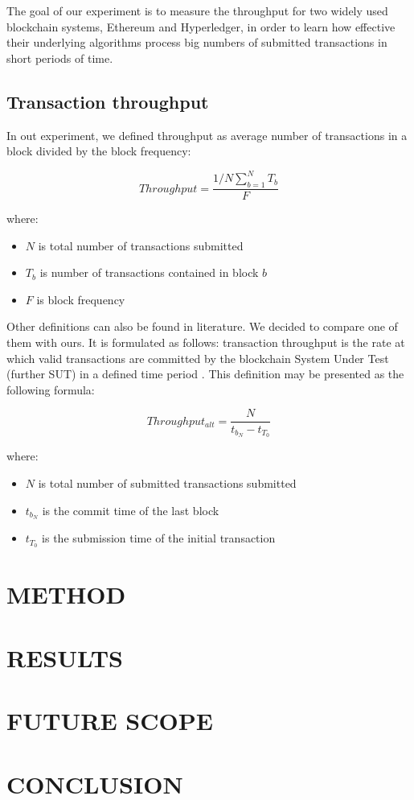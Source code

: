 \documentclass[12pt]{article}
\begin{document}
The goal of our experiment is to measure the throughput for two widely used blockchain systems, Ethereum and Hyperledger, in order to learn how effective their underlying algorithms process big numbers of submitted transactions in short periods of time.

\subsection{Transaction throughput} \label{throughput}
In out experiment, we defined throughput as average number of transactions in a block divided by the block frequency:

$$Throughput = \frac{1/N \sum_{b=1}^{N} T_b}{F}$$

where:
\begin{itemize}
    \item $N$ is total number of transactions submitted
    \item $T_b$ is number of transactions contained in block $b$
    \item $F$ is block frequency
\end{itemize}

Other definitions can also be found in literature. We decided to compare one of them with ours. It is formulated as follows: transaction throughput is the rate at which valid transactions are committed by the blockchain System Under Test (further SUT) in a defined time period \cite{hyperledger_paper}. This definition may be presented as the following formula:

$$Throughput_{alt} = \frac{N}{t_{b_N} - t_{T_0}}$$

where:
\begin{itemize}
    \item $N$ is total number of submitted transactions submitted
    \item $t_{b_N}$ is the commit time of the last block
    \item $t_{T_0}$ is the submission time of the initial transaction
\end{itemize}


\section{METHOD}

\section{RESULTS}

\section{FUTURE SCOPE}

\section{CONCLUSION}


\newpage


\end{document}
